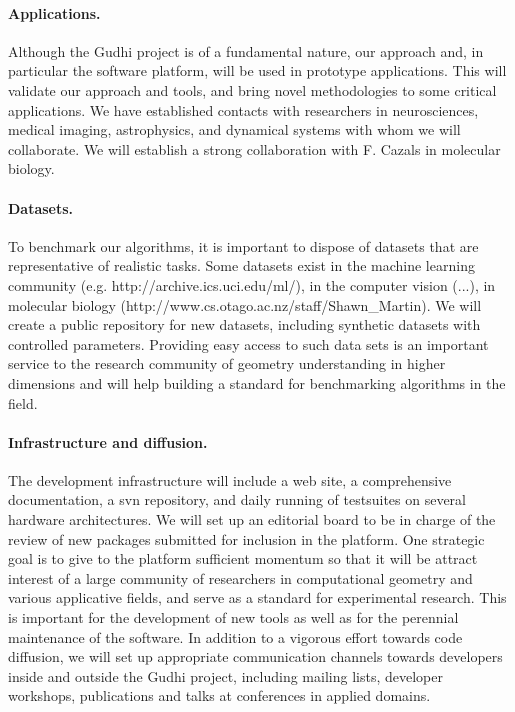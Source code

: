 \paragraph{Applications.}
Although the Gudhi project is of a fundamental nature, our approach
and, in particular the software platform, will be used in prototype
applications.  This will validate our approach and tools, and bring
novel methodologies to some critical applications. We have established
contacts with researchers in neurosciences, medical imaging,
astrophysics, and dynamical systems with whom we will collaborate. We
will establish a strong collaboration with F. Cazals in molecular
biology.

\paragraph{Datasets.}
To benchmark our algorithms, it is important to dispose of datasets
that are representative of realistic tasks. Some datasets exist in the
machine learning community (e.g. http://archive.ics.uci.edu/ml/), in
the computer vision (...), in molecular biology
(http://www.cs.otago.ac.nz/staff/Shawn\_Martin). We will create a
public repository for new  datasets, including synthetic datasets with controlled
parameters. Providing easy access to such data sets is an important service to the
research community of geometry understanding in higher dimensions and 
will help building a standard for benchmarking algorithms in the field.


\paragraph{Infrastructure and diffusion.}
The development infrastructure will include a web site, a
comprehensive documentation, a svn repository, and daily running of
testsuites on several hardware architectures.  We will set up an
editorial board to be in charge of the review of new packages
submitted for inclusion in the platform.  One strategic goal is to
give to the platform sufficient momentum so that it will be attract
interest of a large community of researchers in computational geometry
and various applicative fields, and serve as a standard for
experimental research. This is important for the development of new
tools as well as for the perennial maintenance of the software. In
addition to a vigorous effort towards code diffusion, we will set up
appropriate communication channels towards developers inside and
outside the Gudhi project, including mailing lists, developer
workshops, publications and talks at conferences in applied domains.















